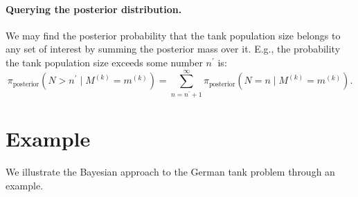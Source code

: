 \documentclass[11pt, oneside]{article}
\newcommand{\data}{$(s_1, ..., s_k)$\xspace}
\begin{document}
\paragraph{Querying the posterior distribution.} We may find the posterior probability that the tank population size belongs to any set of interest by summing the posterior mass over it. E.g., the probability the tank population size exceeds some number $n^\prime$ is:
\begin{equation}
	\pi_{\text{posterior}}(N> n^\prime \mid M^{(k)}=m^{(k)}) = \sum_{n=n^\prime+1}^\infty \pi_{\text{posterior}}(N=n \mid M^{(k)}=m^{(k)}).
\end{equation}




\section{Example}
We illustrate the Bayesian approach to the German tank problem through an example.
\end{document}

